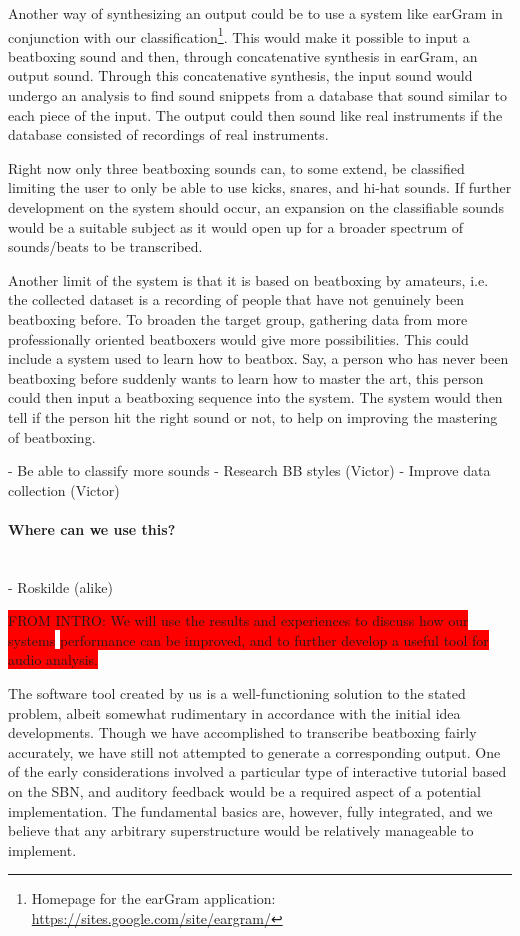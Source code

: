 Another way of synthesizing an output could be to use a system like earGram in conjunction with our classification\footnote{Homepage for the earGram application: \url{https://sites.google.com/site/eargram/}}. This would make it possible to input a beatboxing sound and then, through concatenative synthesis in earGram, an output sound. Through this concatenative synthesis, the input sound would undergo an analysis to find sound snippets from a database that sound similar to each piece of the input. The output could then sound like real instruments if the database consisted of recordings of real instruments.

Right now only three beatboxing sounds can, to some extend, be classified limiting the user to only be able to use kicks, snares, and hi-hat sounds. If further development on the system should occur, an expansion on the classifiable sounds would be a suitable subject as it would open up for a broader spectrum of sounds/beats to be transcribed.

Another limit of the system is that it is based on beatboxing by amateurs, i.e. the collected dataset is a recording of people that have not genuinely been beatboxing before. To broaden the target group, gathering data from more professionally oriented beatboxers would give more possibilities. This could include a system used to learn how to beatbox. Say, a person who has never been beatboxing before suddenly wants to learn how to master the art, this person could then input a beatboxing sequence into the system. The system would then tell if the person hit the right sound or not, to help on improving the mastering of beatboxing.

	- Be able to classify more sounds
		- Research BB styles (Victor)
	- Improve data collection (Victor)


\paragraph{Where can we use this?} \hspace{0pt} \\


	- Roskilde (alike)

\colorbox{red}{FROM INTRO: We will use the results and experiences to discuss how
our systems}
\colorbox{red}{performance can be improved, and to further develop a useful tool for audio
analysis.}

The software tool created by us is a well-functioning solution to the stated problem, albeit somewhat rudimentary in accordance with the initial idea developments. Though we have accomplished to transcribe beatboxing fairly accurately, we have still not attempted to generate a corresponding output. One of the early considerations involved a particular type of interactive tutorial based on the SBN, and auditory feedback would be a required aspect of a potential implementation. The fundamental basics are, however, fully integrated, and we believe that any arbitrary superstructure would be relatively manageable to implement.
